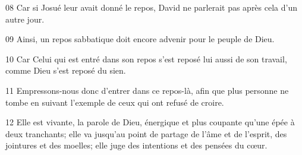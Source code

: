 
08 Car si Josué leur avait donné le repos, David ne parlerait pas après cela d’un autre jour.

09 Ainsi, un repos sabbatique doit encore advenir pour le peuple de Dieu.

10 Car Celui qui est entré dans son repos s’est reposé lui aussi de son travail, comme Dieu s’est reposé du sien.

11 Empressons-nous donc d’entrer dans ce repos-là, afin que plus personne ne tombe en suivant l’exemple de ceux qui ont refusé de croire.

12 Elle est vivante, la parole de Dieu, énergique et plus coupante qu’une épée à deux tranchants; elle va jusqu’au point de partage de l’âme et de l’esprit, des jointures et des moelles; elle juge des intentions et des pensées du cœur.